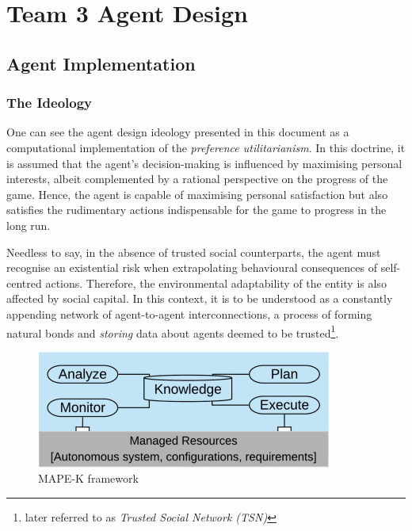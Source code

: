 \chapter{Team 3 Agent Design}\label{team_3_agent_design}

\section{Agent Implementation}
    
    \subsection{The Ideology}
        One can see the agent design ideology presented in this document as a computational implementation of the \textit{preference utilitarianism}. In this doctrine, it is assumed that the agent's decision-making is influenced by maximising personal interests, albeit complemented by a rational perspective on the progress of the game. Hence, the agent is capable of maximising personal satisfaction but also satisfies the rudimentary actions indispensable for the game to progress in the long run.\cite{jeremy}
        
        Needless to say, in the absence of trusted social counterparts, the agent must recognise an existential risk when extrapolating behavioural consequences of self-centred actions. Therefore, the environmental adaptability of the entity is also affected by social capital. In this context, it is to be understood as a constantly appending network of agent-to-agent interconnections, a process of forming natural bonds and \textit{storing} data about agents deemed to be trusted\footnote{later referred to as \textit{Trusted Social Network (TSN)}}.

        \begin{figure}[H]
            \centering
            \includegraphics{006_team_3_agent_design/FIGS/mapek.jpg}
            \caption{MAPE-K framework}
            \label{fig:mapek_framework}
        \end{figure}

